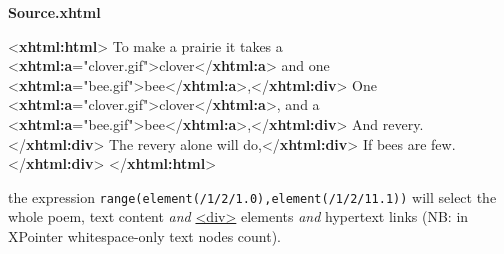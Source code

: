   \textbf{Source.xhtml} \par\bgroup\exampleFont \begin{shaded}\noindent\mbox{}{<\textbf{xhtml:html}>}\mbox{}\newline 
{}\mbox{}\newline 
\hspace*{1em}To make a prairie it takes a {<\textbf{xhtml:a}\hspace*{1em}{href}="{clover.gif}">}clover{</\textbf{xhtml:a}>}\mbox{}\newline 
\hspace*{1em}\hspace*{1em}\hspace*{1em}\hspace*{1em} and one {<\textbf{xhtml:a}\hspace*{1em}{href}="{bee.gif}">}bee{</\textbf{xhtml:a}>},{</\textbf{xhtml:div}>}\mbox{}\newline 
\hspace*{1em}One {<\textbf{xhtml:a}\hspace*{1em}{href}="{clover.gif}">}clover{</\textbf{xhtml:a}>}, and\mbox{}\newline 
\hspace*{1em}\hspace*{1em}\hspace*{1em}\hspace*{1em} a {<\textbf{xhtml:a}\hspace*{1em}{href}="{bee.gif}">}bee{</\textbf{xhtml:a}>},{</\textbf{xhtml:div}>}\mbox{}\newline 
\hspace*{1em}And revery.{</\textbf{xhtml:div}>}\mbox{}\newline 
\hspace*{1em}The revery alone will do,{</\textbf{xhtml:div}>}\mbox{}\newline 
\hspace*{1em}If bees are few.{</\textbf{xhtml:div}>}\mbox{}\newline 
{}\mbox{}\newline 
{</\textbf{xhtml:html}>}\end{shaded}\egroup\par \noindent  the expression \texttt{range(element(/1/2/1.0),element(/1/2/11.1))} will select the whole poem, text content \textit{and} \hyperref[TEI.div]{<div>} elements \textit{and} hypertext links (NB: in XPointer whitespace-only text nodes count).\par

